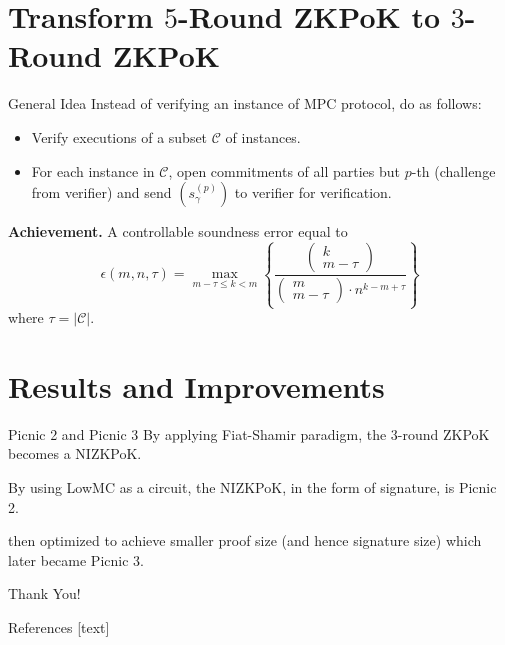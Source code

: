 \documentclass{beamer}
\begin{document}
	\section{Transform $5$-Round ZKPoK to $3$-Round ZKPoK}
	\begin{frame}{General Idea}
		Instead of verifying an instance of MPC protocol, do as follows:
		\begin{itemize}
			\item Verify executions of a subset $\mathcal{C}$ of instances.
			\item For each instance in $\mathcal{C}$, open commitments of all parties but $p$-th (challenge from verifier) and send $(s_\gamma^{(p)})$ to verifier for verification.
		\end{itemize}
		
		\textbf{Achievement.} A controllable soundness error equal to 
		\begin{equation*}
			\epsilon(m, n, \tau) = \max_{m - \tau \leq k < m}\left\{\frac{\begin{pmatrix}
					k\\m-\tau
			\end{pmatrix}}{\begin{pmatrix}
			m\\m-\tau
		\end{pmatrix}\cdot n^{k - m + \tau}}\right\}
		\end{equation*}
		where $\tau = \vert \mathcal{C}\vert$.
	\end{frame}

	\section{Results and Improvements}
	\begin{frame}{Picnic 2 and Picnic 3}
		By applying Fiat-Shamir paradigm, the $3$-round ZKPoK becomes a NIZKPoK.
		
		By using LowMC as a circuit, the NIZKPoK, in the form of signature, is Picnic 2.
		
		\cite{KalesZ20} then optimized to achieve smaller proof size (and hence signature size) which later became Picnic 3.
	\end{frame}
	
	\begin{frame}{}
		\begin{center}
			{\fontsize{20}{20}\selectfont Thank You!}
		\end{center}
	\end{frame}

	\begin{frame}[allowframebreaks]{References}
		
		
		
	\end{frame}
	
\end{document}
